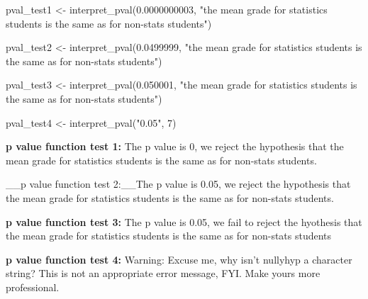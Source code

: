 \documentclass[
  openany]{book}
\newenvironment{Shaded}{\begin{snugshade}}{\end{snugshade}}
\newcommand{\DecValTok}[1]{\textcolor[rgb]{0.00,0.00,0.81}{#1}}
\newcommand{\FloatTok}[1]{\textcolor[rgb]{0.00,0.00,0.81}{#1}}
\newcommand{\FunctionTok}[1]{\textcolor[rgb]{0.00,0.00,0.00}{#1}}
\newcommand{\NormalTok}[1]{#1}
\newcommand{\OtherTok}[1]{\textcolor[rgb]{0.56,0.35,0.01}{#1}}
\newcommand{\StringTok}[1]{\textcolor[rgb]{0.31,0.60,0.02}{#1}}
\begin{document}
\begin{Shaded}
\begin{Highlighting}[]
\NormalTok{pval\_test1 }\OtherTok{\textless{}{-}} \FunctionTok{interpret\_pval}\NormalTok{(}\FloatTok{0.0000000003}\NormalTok{, }
                             \StringTok{"the mean grade for statistics students is the same as for non{-}stats students"}\NormalTok{)}

\NormalTok{pval\_test2 }\OtherTok{\textless{}{-}} \FunctionTok{interpret\_pval}\NormalTok{(}\FloatTok{0.0499999}\NormalTok{, }
                             \StringTok{"the mean grade for statistics students is the same as for non{-}stats students"}\NormalTok{)}

\NormalTok{pval\_test3 }\OtherTok{\textless{}{-}} \FunctionTok{interpret\_pval}\NormalTok{(}\FloatTok{0.050001}\NormalTok{, }
                             \StringTok{"the mean grade for statistics students is the same as for non{-}stats students"}\NormalTok{)}

\NormalTok{pval\_test4 }\OtherTok{\textless{}{-}} \FunctionTok{interpret\_pval}\NormalTok{(}\StringTok{"0.05"}\NormalTok{, }\DecValTok{7}\NormalTok{)}
\end{Highlighting}
\end{Shaded}

\textbf{p value function test 1:} The p value is 0, we reject the hypothesis that the mean grade for statistics students is the same as for non-stats students.

\_\_p value function test 2:\_\_The p value is 0.05, we reject the hypothesis that the mean grade for statistics students is the same as for non-stats students.

\textbf{p value function test 3:} The p value is 0.05, we fail to reject the hyothesis that the mean grade for statistics students is the same as for non-stats students

\textbf{p value function test 4:}
Warning: Excuse me, why isn't nullyhyp a character string?
This is not an appropriate error message, FYI.
Make yours more professional.
\end{document}
